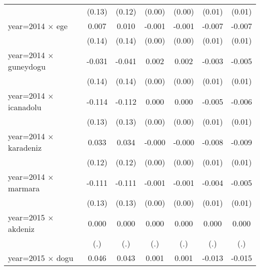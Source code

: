 {\begin{tabular}{l*{6}{c}}
                    &      (0.13)         &      (0.12)         &      (0.00)         &      (0.00)         &      (0.01)         &      (0.01)         \\
year=2014 $\times$ ege&       0.007         &       0.010         &      -0.001         &      -0.001         &      -0.007         &      -0.007         \\
                    &      (0.14)         &      (0.14)         &      (0.00)         &      (0.00)         &      (0.01)         &      (0.01)         \\
year=2014 $\times$ guneydogu&      -0.031         &      -0.041         &       0.002         &       0.002         &      -0.003         &      -0.005         \\
                    &      (0.14)         &      (0.14)         &      (0.00)         &      (0.00)         &      (0.01)         &      (0.01)         \\
year=2014 $\times$ icanadolu&      -0.114         &      -0.112         &       0.000         &       0.000         &      -0.005         &      -0.006         \\
                    &      (0.13)         &      (0.13)         &      (0.00)         &      (0.00)         &      (0.01)         &      (0.01)         \\
year=2014 $\times$ karadeniz&       0.033         &       0.034         &      -0.000         &      -0.000         &      -0.008         &      -0.009         \\
                    &      (0.12)         &      (0.12)         &      (0.00)         &      (0.00)         &      (0.01)         &      (0.01)         \\
year=2014 $\times$ marmara&      -0.111         &      -0.111         &      -0.001         &      -0.001         &      -0.004         &      -0.005         \\
                    &      (0.13)         &      (0.13)         &      (0.00)         &      (0.00)         &      (0.01)         &      (0.01)         \\
year=2015 $\times$ akdeniz&       0.000         &       0.000         &       0.000         &       0.000         &       0.000         &       0.000         \\
                    &         (.)         &         (.)         &         (.)         &         (.)         &         (.)         &         (.)         \\
year=2015 $\times$ dogu&       0.046         &       0.043         &       0.001         &       0.001         &      -0.013         &      -0.015         \\

\end{tabular}}
